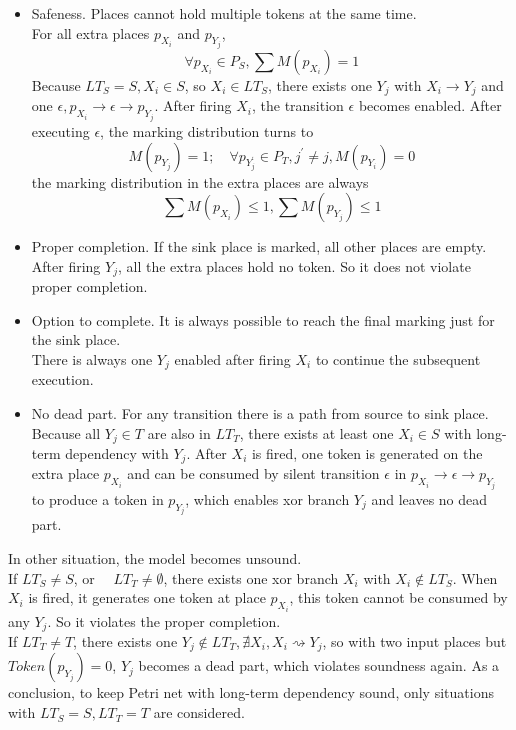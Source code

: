 \begin{itemize}
	\item Safeness. Places cannot hold multiple tokens at the same time.\\
	For all extra places $p_{X_i}$ and $p_{Y_j}$, 
	\[\forall p_{X_i} \in P_S, \sum M(p_{X_i})=1\]
	Because $ LT_S = S, X_i \in S$, so $X_i \in LT_S$, there exists one $Y_j$ with $X_i \rightarrow Y_j$ and one $\epsilon, p_{X_i} \rightarrow \epsilon
	\rightarrow p_{Y_{j}} $.  After firing $X_i$, the transition $\epsilon$ becomes enabled. After executing $\epsilon$, the marking distribution turns to 
	\[ M(p_{Y_j}) = 1;\quad 
	\forall p_{Y_j^\prime} \in P_T, j^\prime \neq j,  M(p_{Y_i})=0 \]
	the marking distribution in the extra places are always
	\[\sum M(p_{X_i}) \leq 1,  \sum M(p_{Y_j}) \leq 1 \] 
	\item Proper completion. If the sink place is marked, all other places are empty. \\
	After firing $Y_j$, all the extra places hold no token. So it does not violate proper completion.
	\item Option to complete.  It is always possible to reach the final marking just for the sink place. \\
	There is always one $Y_j$ enabled after firing $X_i$ to continue the subsequent execution.
	\item No dead part. For any transition there is a path from source to sink place. \\
	Because all $Y_j \in T$ are also in $LT_T$, there exists at least one $X_i\in S$ with long-term dependency with $Y_j$. After $X_i$ is fired, one token is generated on the extra place $p_{X_i}$ and can be consumed by silent transition $\epsilon$ in  $p_{X_i} \rightarrow \epsilon \rightarrow p_{Y_{j}}$ to produce a token in $p_{Y_j}$, which enables xor branch $Y_j$ and leaves no dead part.
\end{itemize}
In other situation, the model becomes unsound. \\
\indent If $LT_S \neq S$, or $\quad LT_T \neq \emptyset$, there exists one xor branch $X_i$ with $X_i \notin LT_S$. When $X_i$ is fired, it generates one token at place $p_{X_i}$, this token cannot be consumed by any $Y_j$. So it violates the proper completion. \\  
\indent If $LT_T \neq T$, there exists one $Y_j \notin LT_T, \nexists X_i, X_i \rightsquigarrow Y_j$, so with two input places but $Token(p_{Y_j})=0$,  $Y_j$ becomes a dead part, which violates soundness again. 
As a conclusion, to keep Petri net with long-term dependency sound, only situations with $ LT_S = S, LT_T=T$ are considered.  
